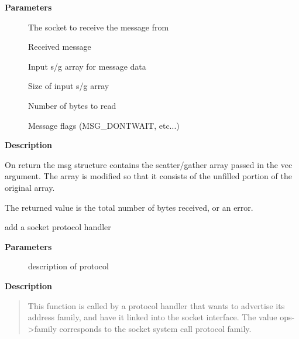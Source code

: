 \documentclass[a4paper,8pt,english]{sphinxmanual}
\begin{document}
\textbf{Parameters}
\begin{description}
\item[{}] \leavevmode
The socket to receive the message from

\item[{}] \leavevmode
Received message

\item[{}] \leavevmode
Input s/g array for message data

\item[{}] \leavevmode
Size of input s/g array

\item[{}] \leavevmode
Number of bytes to read

\item[{}] \leavevmode
Message flags (MSG\_DONTWAIT, etc...)

\end{description}

\textbf{Description}

On return the msg structure contains the scatter/gather array passed in the
vec argument. The array is modified so that it consists of the unfilled
portion of the original array.

The returned value is the total number of bytes received, or an error.

\begin{fulllineitems}
\label{networking/kapi:c.sock_register}
add a socket protocol handler

\end{fulllineitems}


\textbf{Parameters}
\begin{description}
\item[{}] \leavevmode
description of protocol

\end{description}

\textbf{Description}
\begin{quote}

This function is called by a protocol handler that wants to
advertise its address family, and have it linked into the
socket interface. The value ops-\textgreater{}family corresponds to the
socket system call protocol family.
\end{quote}
\end{document}
